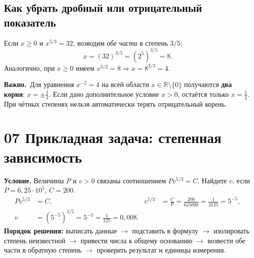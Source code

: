 \documentclass[a4paper,12pt]{article}
\newcommand{\attention}[1]{\medskip\noindent\textcolor{darkaccent}{\bfseries Важно.}\ #1\par\medskip}
\begin{document}
\subsection*{Как убрать дробный или отрицательный показатель}
Если $x\ge0$ и $x^{5/3}=32$, возводим \emph{обе части} в степень $3/5$:
\[
x=(32)^{3/5}=(2^5)^{3/5}=\boxed8.
\]
Аналогично, при $x\ge0$ имеем $x^{3/2}=8\Rightarrow x=8^{2/3}=\boxed4$.

\attention{Для уравнения $x^{-2}=4$ на всей области $x\in\mathbb R\setminus\{0\}$ получаются \textbf{два корня}: $x=\pm\frac12$. Если дано дополнительное условие $x>0$, остаётся только $x=\frac12$. При чётных степенях нельзя автоматически терять отрицательный корень.}

\section*{07 \quad Прикладная задача: степенная зависимость}
\textbf{Условие.} Величины $P$ и $v>0$ связаны соотношением
$Pv^{5/3}=C$. Найдите $v$, если $P=6{,}25\cdot10^5$, $C=200$.
\[
\begin{aligned}
Pv^{5/3}&=C, & v^{5/3}&=\frac CP=\frac{200}{625000}=\frac1{3125}=5^{-5},\\
v&=\left(5^{-5}\right)^{3/5}=5^{-3}=\boxed{\frac1{125}=0{,}008}.
\end{aligned}
\]
\textbf{Порядок решения:} выписать данные $\rightarrow$ подставить в формулу $\rightarrow$ изолировать степень неизвестной $\rightarrow$ привести числа к общему основанию $\rightarrow$ возвести обе части в обратную степень $\rightarrow$ проверить результат и единицы измерения.

\clearpage
\end{document}
